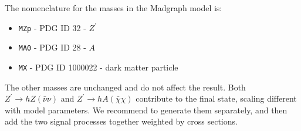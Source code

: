 The nomenclature for the masses in the Madgraph model is:
 \begin{itemize}
 	\item \texttt{MZp} - PDG ID 32 - $Z^\prime$
 	\item \texttt{MA0} - PDG ID 28 - $A$
 	\item \texttt{MX} - PDG ID 1000022 - dark matter particle
 \end{itemize}
 
The other masses are unchanged and do not affect the result. 
 Both $Z^\prime \to hZ(\bar \nu \nu)$ and  $Z^\prime \to hA(\bar \chi \chi)$ contribute to the final state, scaling
 different with model parameters. We recommend to generate them separately, 
 and then add the two signal processes together weighted by cross sections.
 
